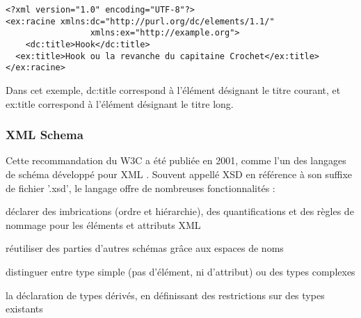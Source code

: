 
\begin{Verbatim}[fontsize=\small,formatcom=\color{black!70}]
<?xml version="1.0" encoding="UTF-8"?>
<ex:racine xmlns:dc="http://purl.org/dc/elements/1.1/"
    			 xmlns:ex="http://example.org">
	<dc:title>Hook</dc:title>
  <ex:title>Hook ou la revanche du capitaine Crochet</ex:title>
</ex:racine>
\end{Verbatim}
Dans cet exemple, dc:title correspond à l'élément désignant le titre courant, et ex:title correspond à l'élément désignant le titre long.


\subsubsection*{XML Schema}
Cette recommandation du W3C a été publiée en 2001, comme l'un des langages de schéma développé pour XML .
Souvent appellé XSD en référence à son suffixe de fichier '.xsd', le langage offre de nombreuses fonctionnalités : 
\begin{liste}
  \item déclarer des imbrications (ordre et hiérarchie), des quantifications et des règles de nommage pour les éléments et attributs XML 
  \item réutiliser des parties d'autres schémas grâce aux espaces de noms 
  \item distinguer entre type simple (pas d'élément, ni d'attribut) ou des types complexes
  \item la déclaration de types dérivés, en définissant des restrictions sur des types existants
\end{liste}


